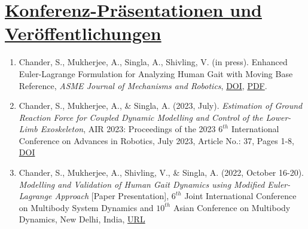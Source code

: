 \section{\underline{Konferenz-Präsentationen und Veröffentlichungen}}
\begin{enumerate}
	\item Chander, S., Mukherjee, A., Singla, A., Shivling, V. (in press). Enhanced Euler-Lagrange Formulation for Analyzing Human Gait with Moving Base Reference, \emph{ASME Journal of Mechanisms and Robotics}, \href{https://doi.org/10.1115/1.4065520}{\large DOI}, \href{https://average-engineer.github.io/Projects-Website-Ashutosh-Mukherjee/Resources/JMR-24-1049.pdf}{\large PDF}.
	\item Chander, S., Mukherjee, A., \& Singla, A. (2023, July). \emph{Estimation of Ground Reaction Force for Coupled Dynamic Modelling and Control of the Lower-Limb Exoskeleton}, AIR 2023: Proceedings of the 2023 $6^{th}$ International Conference on Advances in Robotics, July 2023, Article No.: 37, Pages 1-8, \href{https://doi.org/10.1145/3610419.3610456  }{\large{DOI}}
	\item Chander, S., Mukherjee, A., Shivling, V., \& Singla, A. (2022, October 16-20). \emph{Modelling and Validation of Human Gait Dynamics using Modified Euler-Lagrange Approach} [Paper Presentation], $6^{th}$ Joint International Conference on Multibody System Dynamics and $10^{th}$ Asian Conference on Multibody Dynamics, New Delhi, India, \href{http://imsdacmd2020.iitd.ac.in/web-abstracts/pdf/WEB_ABSTRACTS/IMSDACMD2020_219.pdf}{\large{URL}}
\end{enumerate}
